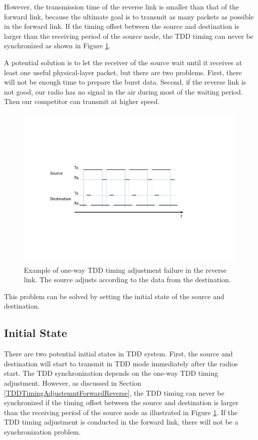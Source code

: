 However, the transmission time of the reverse link is smaller than that of the forward link, because the ultimate goal is to transmit as many packets as possible in the forward link. If the timing offset between the source and destination is larger than the receiving period of the source node, the TDD timing can never be synchronized as shown in Figure \ref{fig:TDDOneWayAdjFailure}.

A potential solution is to let the receiver of the source wait until it receives at least one useful physical-layer packet, but there are two problems. First, there will not be enough time to prepare the burst data. Second, if the reverse link is not good, our radio has no signal in the air during most of the waiting period. Then our competitor can transmit at higher speed.

\begin{figure}[tpb]
  \begin{center}
    \centerline{\includegraphics[width=160mm]{TDDOneWayAdjFailure.pdf}}
    \caption{Example of one-way TDD timing adjustment failure in the reverse link. The source adjusts according to the data from the destination.}
    \label{fig:TDDOneWayAdjFailure}
  \end{center}
\end{figure}

This problem can be solved by setting the initial state of the source and destination.
\subsection{Initial State}
There are two potential initial states in TDD system. First, the source and destination will start to transmit in TDD mode immediately after the radios start. The TDD synchronization depends on the one-way TDD timing adjustment. However, as discussed in Section \ref{TDDTimingAdjustemntForwardReverse}, the TDD timing can never be synchronized if the timing offset between the source and destination is larger than the receiving period of the source node as illustrated in  Figure \ref{fig:TDDOneWayAdjFailure}. If the TDD timing adjustment is conducted in the forward link, there will not be a synchronization problem.

